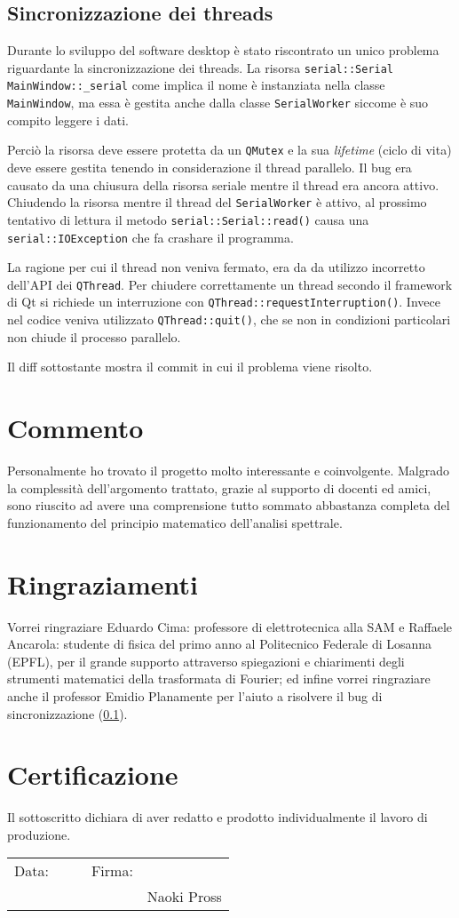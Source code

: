 \subsection{Sincronizzazione dei threads}
\label{sec:err-sync}
Durante lo sviluppo del software desktop \`e stato riscontrato un unico
problema riguardante la sincronizzazione dei threads. La risorsa
\texttt{serial::Serial MainWindow::\_serial}  come implica il nome \`e
instanziata nella classe \texttt{MainWindow}, ma essa \`e gestita anche dalla
classe \texttt{SerialWorker} siccome \`e suo compito leggere i dati.

Perci\`o la risorsa deve essere protetta da un \texttt{QMutex} e la sua
\emph{lifetime} (ciclo di vita) deve essere gestita tenendo in considerazione
il thread parallelo.  Il bug era causato da una chiusura della risorsa seriale
mentre il thread era ancora attivo.  Chiudendo la risorsa mentre il thread del
\texttt{SerialWorker} \`e attivo, al prossimo tentativo di lettura il metodo
\texttt{serial::Serial::read()} causa una \texttt{serial::IOException} che fa
crashare il programma.

La ragione per cui il thread non veniva fermato, era da da utilizzo incorretto
dell'API dei \texttt{QThread}. Per chiudere correttamente un thread secondo il
framework di Qt si richiede un interruzione con
\texttt{QThread::requestInterruption()}. Invece nel codice veniva utilizzato
\texttt{QThread::quit()}, che se non in condizioni particolari non chiude il
processo parallelo.

Il diff  sottostante mostra il commit in cui il problema viene risolto.


\section{Commento}
Personalmente ho trovato il progetto molto interessante e coinvolgente.
Malgrado la complessit\`a dell'argomento trattato, grazie al supporto di
docenti ed amici, sono riuscito ad avere una comprensione tutto sommato
abbastanza completa del funzionamento del principio matematico dell'analisi
spettrale.

\section{Ringraziamenti}
Vorrei ringraziare Eduardo Cima: professore di elettrotecnica alla SAM e
Raffaele Ancarola: studente di fisica del primo anno al Politecnico Federale
di Losanna (EPFL), per il grande supporto attraverso spiegazioni e chiarimenti
degli strumenti matematici della trasformata di Fourier; ed infine vorrei
ringraziare anche il professor Emidio Planamente per l'aiuto a risolvere il
bug di sincronizzazione (\ref{sec:err-sync}).


\section{Certificazione}
Il sottoscritto dichiara di aver redatto e prodotto individualmente il lavoro
di produzione.
\begin{flushright}
\begin{tabular}{ r p{5cm} p{1cm} r p{5cm}}
    Data: & \hrulefill && Firma: & \hrulefill \\
    &&&& Naoki Pross \\
\end{tabular}
\end{flushright}
